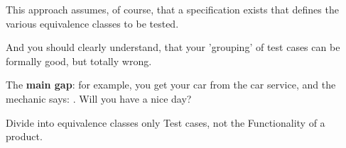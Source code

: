 This approach assumes, of course, that a specification exists that defines the various equivalence classes to be tested. 

And you should clearly understand, that your 'grouping' of test cases can be formally good, but totally wrong.

The \textbf{main gap}: for example, you get your car from the car service, and the mechanic says: . Will you have a nice day?

Divide into equivalence classes only Test cases, not the Functionality of a product.
